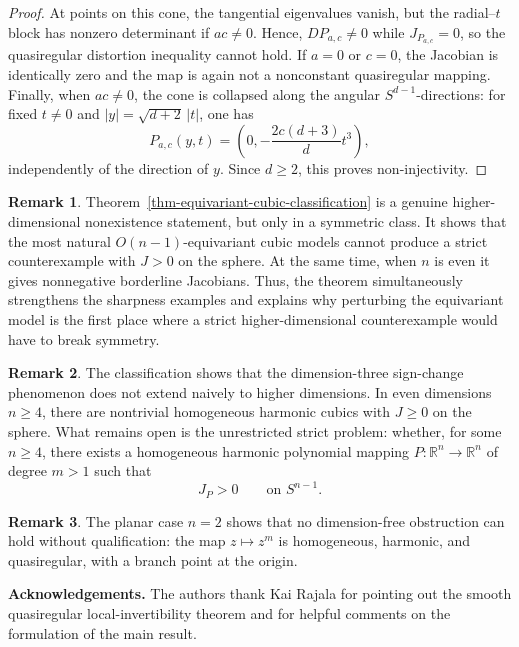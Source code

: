 \documentclass[10pt]{amsart}
\numberwithin{equation}{section}
\theoremstyle{definition}
\newtheorem{remark}{Remark}[section]
\newcommand{\R}{\mathbb R}
\begin{document}
\begin{proof}
At points on this cone, the tangential eigenvalues vanish, but the radial--\(t\)
block has nonzero determinant if \(ac\ne0\). Hence, \(DP_{a,c}\ne0\) while
\(J_{P_{a,c}}=0\), so the quasiregular distortion inequality cannot hold.
If \(a=0\) or \(c=0\), the Jacobian is identically zero and the map is again
not a nonconstant quasiregular mapping. Finally, when \(ac\ne0\), the cone is
collapsed along the angular \(S^{d-1}\)-directions: for fixed \(t\ne0\) and
\(|y|=\sqrt{d+2}\,|t|\), one has
\[
        P_{a,c}(y,t)
        =
        \left(0,
        -\frac{2c(d+3)}d t^3
        \right),
\]
independently of the direction of \(y\). Since \(d\ge2\), this proves
non-injectivity.
\end{proof}

\begin{remark}
Theorem~\ref{thm-equivariant-cubic-classification} is a genuine
higher-dimensional nonexistence statement, but only in a symmetric class. It
shows that the most natural \(O(n-1)\)-equivariant cubic models cannot produce
a strict counterexample with \(J>0\) on the sphere. At the same time, when
\(n\) is even it gives nonnegative borderline Jacobians. Thus, the theorem
simultaneously strengthens the sharpness examples and explains why perturbing
the equivariant model is the first place where a strict higher-dimensional
counterexample would have to break symmetry.
\end{remark}

\begin{remark}
The classification shows that the dimension-three sign-change phenomenon does
not extend naively to higher dimensions. In even dimensions \(n\ge4\), there
are nontrivial homogeneous harmonic cubics with \(J\ge0\) on the sphere. What
remains open is the unrestricted strict problem: whether, for some \(n\ge4\),
there exists a homogeneous harmonic polynomial mapping \(P:\R^n\to\R^n\) of
degree \(m>1\) such that
\[
        J_P>0
        \qquad\text{on }S^{n-1}.
\]
\end{remark}

\begin{remark}
The planar case \(n=2\) shows that no dimension-free obstruction can hold
without qualification: the map \(z\mapsto z^m\) is homogeneous, harmonic,
and quasiregular, with a branch point at the origin.
\end{remark}

\medskip

\noindent\textbf{Acknowledgements.}
The authors thank Kai Rajala for pointing out the smooth quasiregular
local-invertibility theorem and for helpful comments on the formulation of the
main result.
\end{document}
